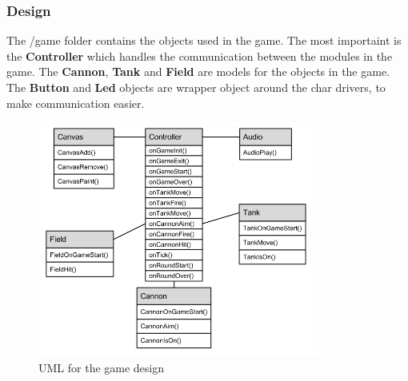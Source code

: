 \subsubsection{Design}

The /game folder contains the objects used in the game. The most importaint is the {\bf Controller}
which handles the communication between the modules in the game. The {\bf Cannon}, {\bf Tank} and
{\bf Field} are models for the objects in the game. The {\bf Button} and {\bf Led} objects are
wrapper object around the char drivers, to make communication easier.

\begin{figure}[h]
  \includegraphics[width=350px]{graphics/game_UML.png}
  \caption{UML for the game design}
\end{figure}
